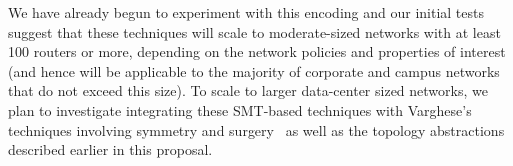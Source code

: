 We have already begun to experiment with this encoding and our initial tests suggest
that these techniques will scale to moderate-sized networks with at least 100 routers or
more, depending on the network policies and properties of interest
(and hence will be applicable to the majority of corporate and campus networks
that do not exceed this size).  To scale to larger data-center sized networks,
we plan to investigate integrating these SMT-based techniques with
Varghese's techniques involving symmetry and surgery~\cite{bjorner+:scaling-network-verification} as well as the topology
abstractions described earlier in this proposal.





